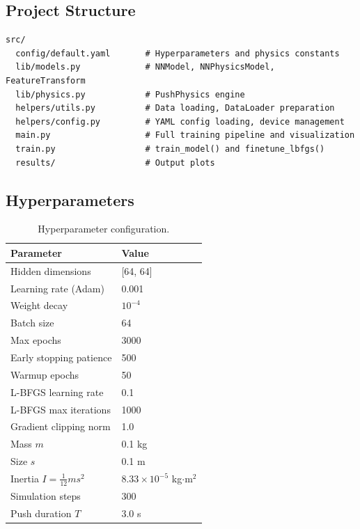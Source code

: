 \documentclass[a4paper]{article}
\newcommand{\ra}[1]{\renewcommand{\arraystretch}{#1}}
\begin{document}
\subsection{Project Structure}

\begin{verbatim}
src/
  config/default.yaml       # Hyperparameters and physics constants
  lib/models.py             # NNModel, NNPhysicsModel, FeatureTransform
  lib/physics.py            # PushPhysics engine
  helpers/utils.py          # Data loading, DataLoader preparation
  helpers/config.py         # YAML config loading, device management
  main.py                   # Full training pipeline and visualization
  train.py                  # train_model() and finetune_lbfgs()
  results/                  # Output plots
\end{verbatim}

\subsection{Hyperparameters}

\begin{table}[H]
\centering
\ra{1.3}
\caption{Hyperparameter configuration.}
\label{tab:hyperparams}
\begin{tabular}{@{}ll@{}}
\toprule
\textbf{Parameter} & \textbf{Value} \\
\midrule
Hidden dimensions & [64, 64] \\
Learning rate (Adam) & 0.001 \\
Weight decay & $10^{-4}$ \\
Batch size & 64 \\
Max epochs & 3000 \\
Early stopping patience & 500 \\
Warmup epochs & 50 \\
L-BFGS learning rate & 0.1 \\
L-BFGS max iterations & 1000 \\
Gradient clipping norm & 1.0 \\
\midrule
Mass $m$ & 0.1 kg \\
Size $s$ & 0.1 m \\
Inertia $I = \tfrac{1}{12}ms^2$ & $8.33 \times 10^{-5}$ kg$\cdot$m$^2$ \\
Simulation steps & 300 \\
Push duration $T$ & 3.0 s \\
\bottomrule
\end{tabular}
\end{table}
\end{document}
